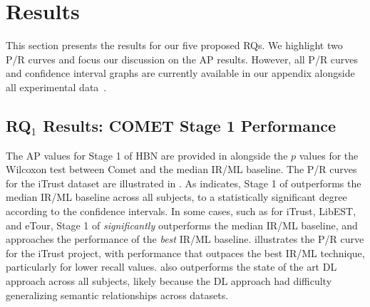 \section{Results}
\label{sec:results-hbn}

This section presents the results for our five proposed RQs. We highlight two P/R curves and focus our discussion on the AP results. However, all P/R curves and confidence interval graphs are currently available in our appendix alongside all experimental data~\citep{appendix}.


\subsection{RQ$_1$ Results: C{\footnotesize OMET} Stage 1 Performance}
\label{sub:results-rq1}


The AP values for Stage 1 of \Comets HBN are provided in  alongside the $p$ values for the Wilcoxon test between Comet and the median IR/ML baseline. The P/R curves for the iTrust dataset are illustrated in . As  indicates, Stage 1 of \Comet outperforms the median IR/ML baseline across all subjects, to a statistically significant degree according to the confidence intervals. In some cases, such as for iTrust, LibEST, and eTour, Stage 1 of \Comet \textit{significantly} outperforms the median IR/ML baseline, and approaches the performance of the \textit{best} IR/ML baseline.  illustrates the P/R curve for the iTrust project, with performance that outpaces the best IR/ML technique, particularly for lower recall values. \Comet also outperforms the state of the art DL approach across all subjects, likely because the DL approach had difficulty generalizing semantic relationships across datasets.